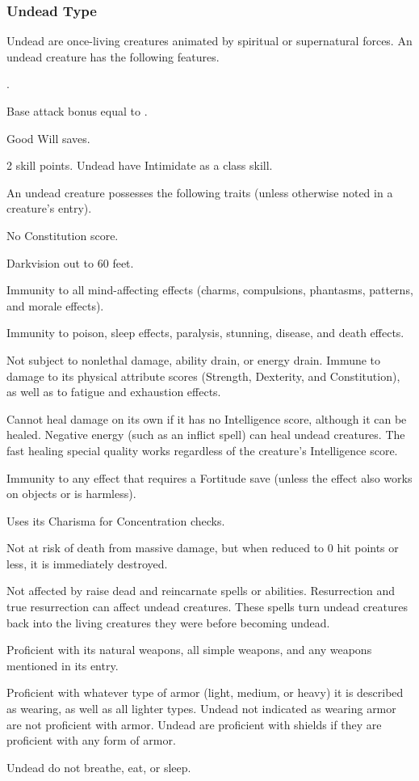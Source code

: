 {\subsubsection{Undead Type} Undead are once-living creatures animated by spiritual or supernatural forces.
 An undead creature has the following features.
\begin{itemize*}
\item {}.
\item Base attack bonus equal to .
\item Good Will saves.
\item 2 skill points. Undead have Intimidate as a class skill.
\end{itemize*}
 An undead creature possesses the following traits (unless otherwise noted in a creature's entry).
\begin{itemize*}
\item No Constitution score.
\item Darkvision out to 60 feet.
\item Immunity to all mind-affecting effects (charms, compulsions, phantasms, patterns, and morale effects).
\item Immunity to poison, sleep effects, paralysis, stunning, disease, and death effects.
\item Not subject to nonlethal damage, ability drain, or energy drain. Immune to damage to its physical attribute scores (Strength, Dexterity, and Constitution), as well as to fatigue and exhaustion effects.
\item Cannot heal damage on its own if it has no Intelligence score, although it can be healed. Negative energy (such as an inflict spell) can heal undead creatures. The fast healing special quality works regardless of the creature's Intelligence score.
\item Immunity to any effect that requires a Fortitude save (unless the effect also works on objects or is harmless).
\item Uses its Charisma for Concentration checks.
\item Not at risk of death from massive damage, but when reduced to 0 hit points or less, it is immediately destroyed.
\item Not affected by raise dead and reincarnate spells or abilities. Resurrection and true resurrection can affect undead creatures. These spells turn undead creatures back into the living creatures they were before becoming undead.
\item Proficient with its natural weapons, all simple weapons, and any weapons mentioned in its entry.
\item Proficient with whatever type of armor (light, medium, or heavy) it is described as wearing, as well as all lighter types. Undead not indicated as wearing armor are not proficient with armor. Undead are proficient with shields if they are proficient with any form of armor.
\item Undead do not breathe, eat, or sleep.
\end{itemize*}

}
